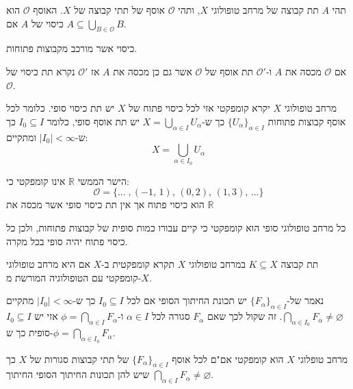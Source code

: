 \documentclass{tstextbook}
\begin{document}
\begin{definition}[כיסוי]
תהי \(A\) תת קבוצה של מרחב טופולוגי \(X\), ותהי \(\mathcal{O}\) אוסף של תתי קבוצה של \(X\). האוסף \(\mathcal{O}\) הוא כיסוי של \(A\) אם \(A\subseteq \bigcup_{ B \in \mathcal{O}}B\).

\end{definition}
\begin{definition}
כיסוי אשר מורכב מקבוצות פתוחות.

\end{definition}
\begin{definition}[תת כיסוי]
אם \(\mathcal{O}\) מכסה את \(A\) ו-\(\mathcal{O}'\) תת אוסף של \(\mathcal{O}\) אשר גם כן מכסה את \(A\) אז \(\mathcal{O'}\) נקרא תת כיסוי של \(\mathcal{O}\).

\end{definition}
\begin{definition}
מרחב טופולוגי \(X\) יקרא קומפקטי אזי לכל כיסוי פתוח של \(X\) יש תת כיסוי סופי.
כלומר לכל אוסף קבוצות פתוחות \(\{ U_{\alpha} \}_{\alpha \in I}\) כך ש-\(X=\bigcup_{\alpha \in I}U_{\alpha}\) יש תת אוסף סופי, כלומר \(I_{0} \subseteq I\) כך ש-\(\lvert I_{0} \rvert<\infty\) ומתקיים:
$$X=\bigcup_{\alpha \in I_{0}}U_{\alpha}$$

\end{definition}
\begin{example}
הישר הממשי \(\mathbb{R}\) אינו קומפקטי כי:
$$\mathcal{O}=\{...\;,(-1,\,1),\,(0,2),\,(1,3),\,...\}$$
הוא כיסוי פתוח אך אין תת כיסוי סופי אשר מכסה את \(\mathbb{R}\)

\end{example}
\begin{example}
כל מרחב טופולוגי סופי הוא קומפקטי כי קיים עבורו כמות סופית של קבוצות פתוחות, ולכן כל כיסוי פתוח יהיה סופי בכל מקרה.

\end{example}
\begin{definition}
תת קבוצה \(K\subseteq X\) במרחב טופולוגי \(X\) תקרא קומפקטית ב-\(X\) אם היא מרחב טופולוגי קומפקטי עם הטופולוגיה המורשת מ-\(X\).

\end{definition}
\begin{definition}
נאמר של-\(\{ F_{\alpha} \}_{\alpha \in I}\) יש תכונת החיתוך הסופי אם לכל \(I_{0} \subseteq I\) כך ש-\(\lvert I_{0} \rvert<\infty\) מתקיים \(\bigcap_{\alpha \in I_{0}}F_{\alpha }\neq \varnothing\).
זה שקול לכך שאם \(F_{\alpha}\) סגורה לכל \(\alpha \in I\) ו-\(\phi = \bigcap_{\alpha \in I} F_{\alpha}\) אזי יש \(I_{0}\subseteq I\) סופית כך ש-\(\phi=\bigcap_{\alpha \in I_{0}}F_{\alpha}\).

\end{definition}
\begin{proposition}
מרחב טופלוגי \(X\) הוא קומפקטי אם"ם לכל אוסף \(\{ F_{\alpha} \}_{\alpha \in I}\) של תתי קבוצות סגורות של \(X\) כך שיש להן תכונות החיתוך הסופי החיתוך \(\bigcap_{\alpha \in I}F_{\alpha}\neq \varnothing\). 

\end{proposition}
\end{document}
